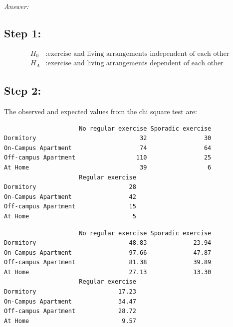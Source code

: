 \documentclass[
]{book}
\newenvironment{Shaded}{\begin{snugshade}}{\end{snugshade}}
\newcommand{\DecValTok}[1]{\textcolor[rgb]{0.00,0.00,0.81}{#1}}
\newcommand{\FunctionTok}[1]{\textcolor[rgb]{0.00,0.00,0.00}{#1}}
\newcommand{\NormalTok}[1]{#1}
\newcommand{\SpecialCharTok}[1]{\textcolor[rgb]{0.00,0.00,0.00}{#1}}
\begin{document}
\emph{Answer:}

\hypertarget{step-1}{%
\subsection{Step 1:}\label{step-1}}

\begin{align*}
H_0 &: \text{exercise and living arrangements independent of each other}\\
H_A &: \text{exercise and living arrangements dependent of each other}
\end{align*}

\hypertarget{step-2}{%
\subsection{Step 2:}\label{step-2}}

The observed and expected values from the chi square test are:

\begin{Shaded}
\end{Shaded}

\begin{verbatim}
                     No regular exercise Sporadic exercise
Dormitory                             32                30
On-Campus Apartment                   74                64
Off-campus Apartment                 110                25
At Home                               39                 6
                     Regular exercise
Dormitory                          28
On-Campus Apartment                42
Off-campus Apartment               15
At Home                             5
\end{verbatim}

\begin{Shaded}
\end{Shaded}

\begin{verbatim}
                     No regular exercise Sporadic exercise
Dormitory                          48.83             23.94
On-Campus Apartment                97.66             47.87
Off-campus Apartment               81.38             39.89
At Home                            27.13             13.30
                     Regular exercise
Dormitory                       17.23
On-Campus Apartment             34.47
Off-campus Apartment            28.72
At Home                          9.57
\end{verbatim}
\end{document}
